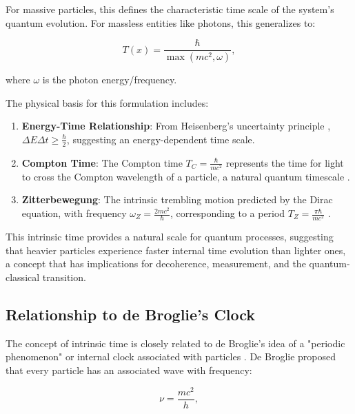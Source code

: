 \documentclass[12pt,a4paper]{article}
\newcommand{\Tfield}{T(x)}
\begin{document}
	For massive particles, this defines the characteristic time scale of the system's quantum evolution. For massless entities like photons, this generalizes to:
	
	\begin{equation}
		\Tfield = \frac{\hbar}{\max(mc^2, \omega)},
		\label{eq:intrinsic_time_general}
	\end{equation}
	
	where $\omega$ is the photon energy/frequency.
	
	The physical basis for this formulation includes:
	
	\begin{enumerate}
		\item \textbf{Energy-Time Relationship}: From Heisenberg's uncertainty principle \cite{Heisenberg1927, Mandelstam1945}, $\Delta E \Delta t \geq \frac{\hbar}{2}$, suggesting an energy-dependent time scale.
		
		\item \textbf{Compton Time}: The Compton time $T_C = \frac{\hbar}{mc^2}$ represents the time for light to cross the Compton wavelength of a particle, a natural quantum timescale \cite{MacGibbon1987, Caldirola1953}.
		
		\item \textbf{Zitterbewegung}: The intrinsic trembling motion predicted by the Dirac equation, with frequency $\omega_Z = \frac{2mc^2}{\hbar}$, corresponding to a period $T_Z = \frac{\pi\hbar}{mc^2}$ \cite{Dirac1928, Schrodinger1930, Hestenes1990}.
	\end{enumerate}
	
	This intrinsic time provides a natural scale for quantum processes, suggesting that heavier particles experience faster internal time evolution than lighter ones, a concept that has implications for decoherence, measurement, and the quantum-classical transition.
	
	\subsection{Relationship to de Broglie's Clock}
	\label{subsec:debroglie_clock}
	
	The concept of intrinsic time is closely related to de Broglie's idea of a "periodic phenomenon" or internal clock associated with particles \cite{deBroglie1923, deBroglie1924}. De Broglie proposed that every particle has an associated wave with frequency:
	
	\begin{equation}
		\nu = \frac{mc^2}{h},
		\label{eq:debroglie_frequency}
	\end{equation}
	
\end{document}
